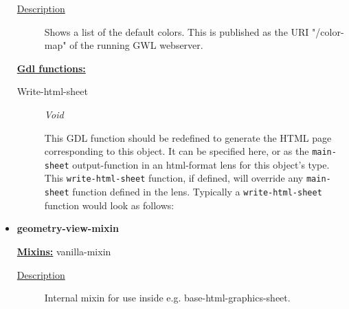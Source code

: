 \documentclass [11pt]{book}
\begin{document}
\begin{itemize}
\begin{description}

\item [
\underline{Description}]


Shows a list of the default colors. This is published as the URI "/color-map" of the running GWL webserver.



\end{description}








\textbf{
\underline{Gdl functions:}}

\begin{description}

\item [Write-html-sheet]
\emph{Void}

 This GDL function should be redefined to generate the HTML page corresponding to this object.
It can be specified here, or as the \texttt{main-sheet} output-function in an html-format lens for this
object's type. This \texttt{write-html-sheet} function, if defined,  will override any \texttt{main-sheet}
function defined in the lens. Typically a \texttt{write-html-sheet} function would look as follows:




\end{description}







\item {}
\label{prim:geometry-view-mixin}
\textbf{geometry-view-mixin}


\textbf{
\underline{Mixins:}} vanilla-mixin





\begin{description}

\item [
\underline{Description}]


Internal mixin for use inside e.g. base-html-graphics-sheet.



\end{description}









\end{itemize}
\end{document}
